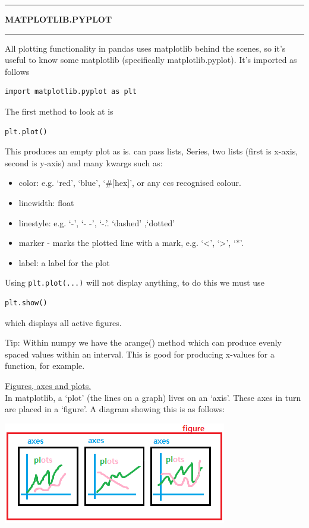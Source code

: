 \documentclass[8pt]{extarticle}
\newcommand{\heading}[1]{%
    \noindent
    \rule{\linewidth}{0.4pt}
    \begin{center}
        \vspace{-1ex}
        \textbf{#1}        
        \vspace{-2.5ex}
    \end{center}
    \rule{\linewidth}{0.4pt}
}
\begin{document}
\begin{multicols}{4}
\setlength{\columnseprule}{1pt} %

\heading{MATPLOTLIB.PYPLOT}

All plotting functionality in pandas uses matplotlib behind the scenes, so it's useful to know some matplotlib (specifically matplotlib.pyplot). It's imported as follows

\begin{lstlisting}[style=Python]
import matplotlib.pyplot as plt
\end{lstlisting}

The first method to look at is 
\begin{lstlisting}[style=Python]
plt.plot()
\end{lstlisting}
This produces an empty plot as is. can pass lists, Series, two lists (first is x-axis, second is y-axis) and many kwargs such as:
\begin{itemize}
    \item color: e.g. `red', `blue', `\#[hex]', or any ccs recognised colour.
    \item linewidth: float
    \item linestyle: e.g. `-', `- -', `-.'. `dashed' ,`dotted'
    \item marker - marks the plotted line with a mark, e.g. `<', `>', `$\ast$'.
    \item label: a label for the plot
\end{itemize}

Using \lstinline[style=Python]!plt.plot(...)! will not display anything, to do this we must use 
\begin{lstlisting}[style=Python]
plt.show()
\end{lstlisting}
which displays all active figures.

\begin{tcolorbox}[width=\columnwidth, colback=white!95!black]
Tip: Within numpy we have the arange() method which can produce evenly spaced values within an interval. This is good for producing x-values for a function, for example.
\end{tcolorbox}

\underline{Figures, axes and plots.}\\

In matplotlib, a `plot' (the lines on a graph) lives on an `axis'. These axes in turn are placed in a `figure'. A diagram showing this is as follows:

\begin{center}
\includegraphics[scale = 0.64]{images/pyplot_levels.png}
\end{center}


\end{multicols}
\end{document}
